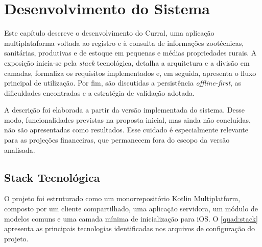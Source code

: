 \chapter{Desenvolvimento do Sistema}
\label{cap:desenvolvimento}

Este capítulo descreve o desenvolvimento do Curral, uma aplicação multiplataforma voltada ao registro e à consulta de informações zootécnicas, sanitárias, produtivas e de estoque em pequenas e médias propriedades rurais. A exposição inicia-se pela \textit{stack} tecnológica, detalha a arquitetura e a divisão em camadas, formaliza os requisitos implementados e, em seguida, apresenta o fluxo principal de utilização. Por fim, são discutidas a persistência \textit{offline-first}, as dificuldades encontradas e a estratégia de validação adotada.

A descrição foi elaborada a partir da versão implementada do sistema. Desse modo, funcionalidades previstas na proposta inicial, mas ainda não concluídas, não são apresentadas como resultados. Esse cuidado é especialmente relevante para as projeções financeiras, que permanecem fora do escopo da versão analisada.

\section{Stack Tecnológica}
\label{sec:desenvolvimento-stack}

O projeto foi estruturado como um monorrepositório Kotlin Multiplatform, composto por um cliente compartilhado, uma aplicação servidora, um módulo de modelos comuns e uma camada mínima de inicialização para iOS. O \autoref{quad:stack} apresenta as principais tecnologias identificadas nos arquivos de configuração do projeto.

